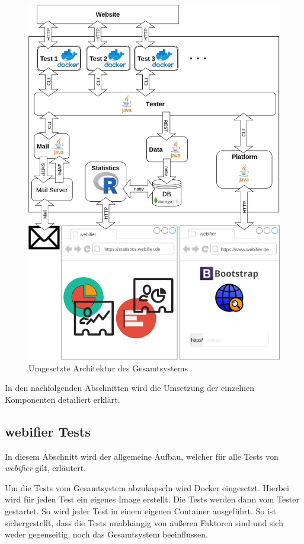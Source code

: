 \begin{figure}[H]
	\centering
	\includegraphics[width=\textwidth]{images/anwendung-umsetzung}
	\caption{Umgesetzte Architektur des Gesamtsystems}
	\label{fig:anwendung-umsetzung}
\end{figure}

In den nachfolgenden Abschnitten wird die Umsetzung der einzelnen Komponenten detailiert erklärt.

\subsection{webifier Tests}
In diesem Abschnitt wird der allgemeine Aufbau, welcher für alle Tests von \textit{webifier} gilt,
erläutert.

Um die Tests vom Gesamtsystem abzukapseln wird Docker eingesetzt. Hierbei wird für jeden Test ein
eigenes Image erstellt. Die Tests werden dann vom Tester gestartet. So wird jeder Test in einem
eigenen Container ausgeführt. So ist sichergestellt, dass die Tests unabhängig von äußeren Faktoren
sind und sich weder gegenseitig, noch das Gesamtsystem beeinflussen.

